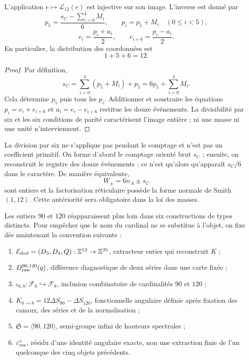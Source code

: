 \begin{theorem}
\label{thm:memoria-1-5-6}
L'application \(e\mapsto\mathscr L_{12}(e)\) est injective sur son image.
L'inverse est donné par
\[
 p_5=\frac{s_C-\sum_{i=0}^{4}M_i}{6},\qquad
 p_i=p_5+M_i\quad(0\le i<5),
\]
\[
 e_i=\frac{p_i+a_i}{2},\qquad
 e_{i+6}=\frac{p_i-a_i}{2}.
\]
En particulier, la distribution des coordonnées est
\[
 \boxed{1+5+6=12}.
\]
\end{theorem}

\begin{proof}
Par définition,
\[
 s_C=\sum_{i=0}^{4}(p_5+M_i)+p_5
 =6p_5+\sum_{i=0}^{4}M_i.
\]
Cela détermine \(p_5\) puis tous les \(p_i\). Additionner et soustraire les
équations \(p_i=e_i+e_{i+6}\) et \(a_i=e_i-e_{i+6}\) restitue les douze
événements. La divisibilité par six et les six conditions de parité
caractérisent l'image entière ; ni une masse ni une unité n'interviennent.
\end{proof}

La division par six ne s'applique pas pendant le comptage et n'est pas un coefficient
primitif. On forme d'abord le comptage orienté brut \(s_C\) ; ensuite, on
reconstruit le registre des douze événements ; ce n'est qu'alors qu'apparaît
\(s_C/6\) dans le caractère. De manière équivalente,
\[
 W_\pm=6n_A\pm s_C
\]
sont entiers et la factorisation réticulaire possède la forme normale de Smith
\((1,12)\). Cette antériorité sera obligatoire dans la loi des masses.

Les entiers \(90\) et \(120\) réapparaissent plus loin dans six constructions
de types distincts. Pour empêcher que le nom du cardinal ne se substitue à
l'objet, on fixe dès maintenant la convention suivante :

\begin{enumerate}
 \item \(\mathcal E_{\rm dod}=(D_3,D_4,Q):\mathbb Z^{12}\to\mathbb Z^{25}\),
       extracteur entier qui reconstruit \(K\) ;
 \item \(D_{\rm raw}^{90,120}(q)\), différence diagnostique de deux séries dans
       une carte fixée ;
 \item \(\iota_{6,8}:\mathcal F_6\hookrightarrow\mathcal F_8\), inclusion
       combinatoire de cardinalités \(90\) et \(120\) ;
 \item \(K_{6\to8}=12\Delta S_{90}-\Delta S_{120}\), fonctionnelle angulaire
       définie après fixation des canaux, des séries et de la normalisation ;
 \item \(\mathfrak S=\langle90,120\rangle\), semi-groupe infini de hauteurs
       spectrales ;
 \item \(\varepsilon_{\rm res}^{\circ}\), résidu d'une identité angulaire
       exacte, non une extraction finie de l'un quelconque des cinq objets
       précédents.
\end{enumerate}

